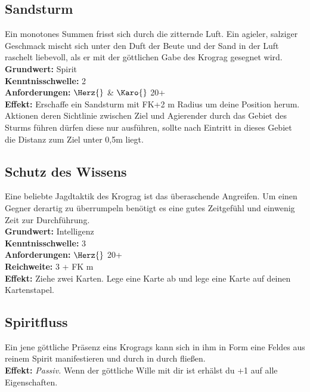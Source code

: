 \subsection*{Sandsturm} \label{sk:sandsturm}
Ein monotones Summen frisst sich durch die zitternde Luft. Ein agieler, salziger Geschmack mischt sich unter den Duft der Beute und der Sand in der Luft raschelt liebevoll, als er mit der göttlichen Gabe des Krograg gesegnet wird.\\
\textbf{Grundwert:} Spirit \\
\textbf{Kenntnisschwelle:} 2 \\
\textbf{Anforderungen:} $\Herz{}$ \& $\Karo{}$ 20+ \\
\textbf{Effekt:} Erschaffe ein Sandsturm mit FK+2 m Radius um deine Position herum. Aktionen deren Sichtlinie zwischen Ziel und Agierender durch das Gebiet des Sturms führen dürfen diese nur ausführen, sollte nach Eintritt in dieses Gebiet die Distanz zum Ziel unter 0,5m liegt.

\subsection*{Schutz des Wissens} \label{sk:schutzdeswissens}
Eine beliebte Jagdtaktik des Krograg ist das überaschende Angreifen. Um einen Gegner derartig zu überrumpeln benötigt es eine gutes Zeitgefühl und einwenig Zeit zur Durchführung.\\
\textbf{Grundwert:} Intelligenz \\
\textbf{Kenntnisschwelle:} 3 \\
\textbf{Anforderungen:} $\Herz{}$ 20+ \\
\textbf{Reichweite:} 3 + FK m \\
\textbf{Effekt:} Ziehe zwei Karten. Lege eine Karte ab und lege eine Karte auf deinen Kartenstapel.

\subsection*{Spiritfluss} \label{sk:spiritfluss}
Ein jene göttliche Präsenz eins Krogrags kann sich in ihm in Form eine Feldes aus reinem Spirit manifestieren und durch in durch fließen.\\
\textbf{Effekt:} \textit{Passiv.} Wenn der göttliche Wille mit dir ist erhälst du +1 auf alle Eigenschaften.

